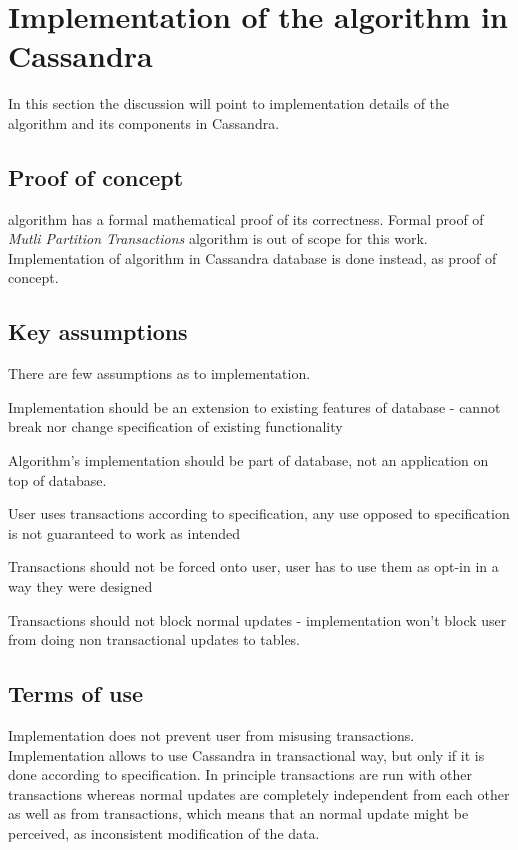 

\chapter{Implementation of the algorithm in Cassandra}\label{sec:mpp:impl}
In this section the discussion will point to implementation details of the algorithm and its components in Cassandra. 


\section{Proof of concept}
\paxos algorithm has a formal mathematical proof of its correctness. \cite{Lamport1998partTimeParliment} Formal proof of \emph{Mutli Partition Transactions} algorithm is out of scope for this work. Implementation of algorithm in Cassandra database is done instead, as proof of concept. 



\section{Key assumptions}
There are few assumptions as to implementation.
\begin{enumerate*}
\item  Implementation should be an extension to existing features of database - cannot break nor change specification of existing functionality
\item Algorithm’s implementation should be part of database, not an application on top of database.
\item User uses transactions according to specification, any use opposed to specification is not guaranteed to work as intended
\item Transactions should not be forced onto user, user has to use them as opt-in in a way they were designed
\item Transactions should not block normal updates - implementation won’t block user from doing non transactional updates to tables.
\end{enumerate*}

\section{Terms of use}
Implementation does not prevent user from misusing transactions. Implementation allows to use Cassandra in transactional way, but only if it is done according to specification. In principle transactions are run with other transactions whereas normal updates are completely independent from each other as well as from transactions, which means that an normal update might be perceived, as inconsistent modification of the data.


